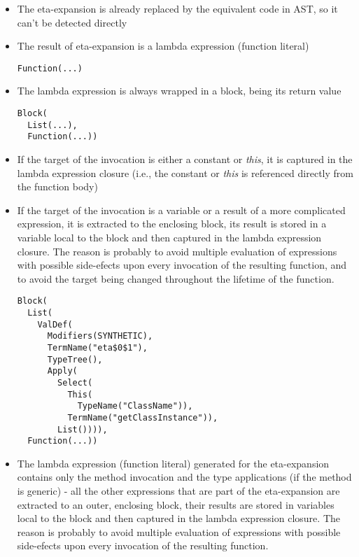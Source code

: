 \begin{itemize}
	\item The eta-expansion is already replaced by the equivalent code in AST, so it can't be detected directly
	\item The result of eta-expansion is a lambda expression (function literal)
\lstset{style=Dump}
\begin{lstlisting}
Function(...)
\end{lstlisting}
	\item The lambda expression is always wrapped in a block, being its return value
	
\lstset{style=Dump}
\begin{lstlisting}
Block(
  List(...), 
  Function(...))
\end{lstlisting}	
	
	\item If the target of the invocation is either a constant or \textit{this}, it is captured in the lambda expression closure (i.e., the constant or \textit{this} is referenced directly from the function body)
	
	\item If the target of the invocation is a variable or a result of a more complicated expression, it is extracted to the enclosing block, its result is stored in a variable local to the block and then captured in the lambda expression closure. The reason is probably to avoid multiple evaluation of expressions with possible side-efects upon every invocation of the resulting function, and to avoid the target being changed throughout the lifetime of the function.
	
\begin{lstlisting}
Block(
  List(
    ValDef(
      Modifiers(SYNTHETIC), 
      TermName("eta$0$1"), 
      TypeTree(), 
      Apply(
        Select(
          This(
            TypeName("ClassName")), 
          TermName("getClassInstance")), 
        List()))), 
  Function(...))
\end{lstlisting}

	
	\item The lambda expression (function literal) generated for the eta-expansion contains only the method invocation and the type applications (if the method is generic) - all the other expressions that are part of the eta-expansion are extracted to an outer, enclosing block, their results are stored in variables local to the block and then captured in the lambda expression closure. The reason is probably to avoid multiple evaluation of expressions with possible side-efects upon every invocation of the resulting function.
\end{itemize}

